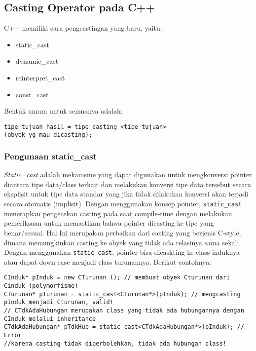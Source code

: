 \subsection{Casting Operator pada C++}\label{casting-operator-pada-c}

C++ memiliki cara pengcastingan yang baru, yaitu:

\begin{itemize}
\tightlist
\item
  static\_cast
\item
  dynamic\_cast
\item
  reinterpret\_cast
\item
  const\_cast
\end{itemize}

Bentuk umum untuk semuanya adalah:

\begin{verbatim}
tipe_tujuan hasil = tipe_casting <tipe_tujuan> (obyek_yg_mau_dicasting);
\end{verbatim}

\subsubsection{Pengunaan static\_cast}\label{pengunaan-staticux5fcast}

\emph{Static\_cast} adalah mekanisme yang dapat digunakan untuk
mengkonversi pointer diantara tipe data/class terkait dan melakukan
konversi tipe data tersebut secara eksplisit untuk tipe data standar
yang jika tidak dilakukan konversi akan terjadi secara otomatis
(implisit). Dengan menggunakan konsep pointer, \texttt{static\_cast}
menerapkan pengecekan casting pada saat compile-time dengan melakukan
pemeriksaan untuk memastikan bahwa pointer dicasting ke tipe yang
benar/sesuai. Hal Ini merupakan perbaikan dari casting yang berjenis
C-style, dimana memungkinkan casting ke obyek yang tidak ada relasinya
sama sekali. Dengan menggunakan \texttt{static\_cast}, pointer bisa
dicaskting ke class induknya atau dapat down-case menjadi class
turunannya. Berikut contohnya:

\begin{verbatim}
CInduk* pInduk = new CTurunan (); // membuat obyek Cturunan dari Cinduk (polymorfisme)
CTurunan* pTurunan = static_cast<CTurunan*>(pInduk); // mengcasting pInduk menjadi Cturunan, valid!
// CTdkAdaHubungan merupakan class yang tidak ada hubungannya dengan CInduk melalui inheritance
CTdkAdaHubungan* pTdkHub = static_cast<CTdkAdaHubungan*>(pInduk); // Error
//karena casting tidak diperbolehkan, tidak ada hubungan class!
\end{verbatim}

